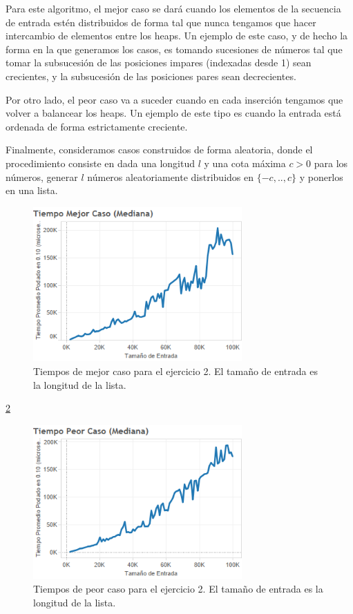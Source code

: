 \documentclass{article}
\theoremstyle{definition}
\theoremstyle{remark}
\begin{document}
Para este algoritmo, el mejor caso se dará cuando los elementos de la secuencia de entrada estén distribuidos de forma tal que nunca tengamos que hacer intercambio de elementos entre los heaps. Un ejemplo de este caso, y de hecho la forma en la que generamos los casos, es tomando sucesiones de números tal que tomar la subsucesión de las posiciones impares (indexadas desde 1) sean crecientes, y la subsucesión de las posiciones pares sean decrecientes.

Por otro lado, el peor caso va a suceder cuando en cada inserción tengamos que volver a balancear los heaps. Un ejemplo de este tipo es cuando la entrada está ordenada de forma estrictamente creciente.

Finalmente, consideramos casos construidos de forma aleatoria, donde el procedimiento consiste en dada una longitud $l$ y una cota máxima $c > 0$ para los números, generar $l$ números aleatoriamente distribuidos en $\{-c, .., c\}$ y ponerlos en una lista.

\begin{figure}[h!]
\centering
\label{grf:ex2-best}
\includegraphics[width=8cm]{images/ex2-best}
\caption{Tiempos de mejor caso para el ejercicio 2. El tamaño de entrada es la longitud de la lista.}
\end{figure}

\ref{grf:ex2-worst}

\begin{figure}[h!]
\centering
\label{grf:ex2-worst}
\includegraphics[width=8cm]{images/ex2-worst}
\caption{Tiempos de peor caso para el ejercicio 2. El tamaño de entrada es la longitud de la lista.}
\end{figure}
\end{document}
